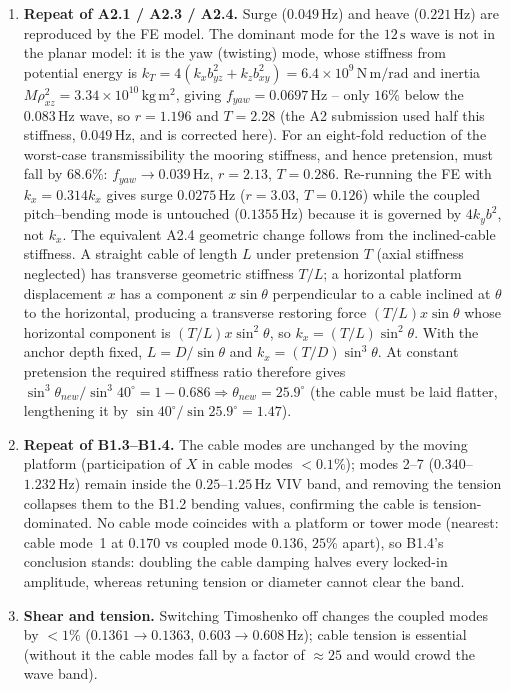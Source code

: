 \documentclass[11pt,a4paper]{article}
\begin{document}
\begin{enumerate}
\item \textbf{Repeat of A2.1 / A2.3 / A2.4.} Surge ($0.049\,\mathrm{Hz}$) and heave ($0.221\,\mathrm{Hz}$) are reproduced by the FE model. The dominant mode for the $12\,\mathrm{s}$ wave is not in the planar model: it is the yaw (twisting) mode, whose stiffness from potential energy is $k_{T}=4(k_xb_{yz}^2+k_zb_{xy}^2)=6.4\times10^9\,\mathrm{N\,m/rad}$ and inertia $M\rho_{xz}^2=3.34\times10^{10}\,\mathrm{kg\,m^2}$, giving $f_{yaw}=0.0697\,\mathrm{Hz}$ -- only $16\%$ below the $0.083\,\mathrm{Hz}$ wave, so $r=1.196$ and $T=2.28$ (the A2 submission used half this stiffness, $0.049\,\mathrm{Hz}$, and is corrected here). For an eight-fold reduction of the worst-case transmissibility the mooring stiffness, and hence pretension, must fall by $68.6\%$: $f_{yaw}\to0.039\,\mathrm{Hz}$, $r=2.13$, $T=0.286$. Re-running the FE with $k_x=0.314k_x$ gives surge $0.0275\,\mathrm{Hz}$ ($r=3.03$, $T=0.126$) while the coupled pitch--bending mode is untouched ($0.1355\,\mathrm{Hz}$) because it is governed by $4k_yb^2$, not $k_x$. The equivalent A2.4 geometric change follows from the inclined-cable stiffness. A straight cable of length $L$ under pretension $T$ (axial stiffness neglected) has transverse geometric stiffness $T/L$; a horizontal platform displacement $x$ has a component $x\sin\theta$ perpendicular to a cable inclined at $\theta$ to the horizontal, producing a transverse restoring force $(T/L)x\sin\theta$ whose horizontal component is $(T/L)x\sin^2\theta$, so $k_x=(T/L)\sin^2\theta$. With the anchor depth fixed, $L=D/\sin\theta$ and $k_x=(T/D)\sin^3\theta$. At constant pretension the required stiffness ratio therefore gives $\sin^3\theta_{new}/\sin^3 40^\circ=1-0.686\Rightarrow\theta_{new}=25.9^\circ$ (the cable must be laid flatter, lengthening it by $\sin40^\circ/\sin25.9^\circ=1.47$).
\item \textbf{Repeat of B1.3--B1.4.} The cable modes are unchanged by the moving platform (participation of $X$ in cable modes $<0.1\%$); modes 2--7 ($0.340$--$1.232\,\mathrm{Hz}$) remain inside the $0.25$--$1.25\,\mathrm{Hz}$ VIV band, and removing the tension collapses them to the B1.2 bending values, confirming the cable is tension-dominated. No cable mode coincides with a platform or tower mode (nearest: cable mode~1 at $0.170$ vs coupled mode $0.136$, $25\%$ apart), so B1.4's conclusion stands: doubling the cable damping halves every locked-in amplitude, whereas retuning tension or diameter cannot clear the band.
\item \textbf{Shear and tension.} Switching Timoshenko off changes the coupled modes by $<1\%$ ($0.1361\to0.1363$, $0.603\to0.608\,\mathrm{Hz}$); cable tension is essential (without it the cable modes fall by a factor of $\approx25$ and would crowd the wave band).
\end{enumerate}
\end{document}
